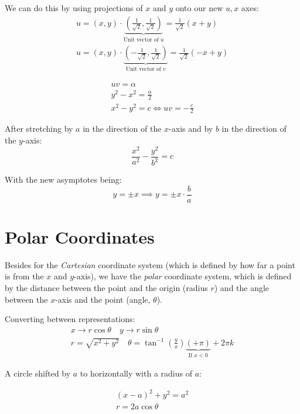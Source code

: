 \documentclass[00_complete]{subfiles}
\begin{document}
We can do this by using projections of $x$ and $y$ onto our new $u, x$ axes:
$$
\begin{gathered}
    u = (x,y) \cdot \underbrace{\left( \frac{1}{\sqrt 2}, \frac{1}{\sqrt 2}\right)}_{\text{Unit vector of $u$}} = \frac{1}{\sqrt 2}( x+y) \\
    u = (x,y) \cdot \underbrace{\left(-\frac{1}{\sqrt 2}, \frac{1}{\sqrt 2}\right)}_{\text{Unit vector of $v$}} = \frac{1}{\sqrt 2}(-x+y)
\end{gathered}
$$

\begin{conclusion}
$$
\begin{gathered}
    uv = \alpha \\
    y^2 - x^2 = \frac{\alpha}{2} \\
    x^2 - y^2 = c \iff uv = -\frac{c}{2}
\end{gathered}
$$
\end{conclusion}

After stretching by $a$ in the direction of the $x$-axis and by $b$ in the
direction of the $y$-axis:
$$\frac{x^2}{a^2} - \frac{y^2}{b^2} = c$$

With the new asymptotes being:
$$y=\pm x \implies y=\pm x \cdot \frac{b}{a}$$

\section{Polar Coordinates}

Besides for the \emph{Cartesian} coordinate system (which is defined by how far a
point is from the $x$ and $y$-axis), we have the \emph{polar} coordinate system,
which is defined by the distance between the point and the origin (radius $r$) and
the angle between the $x$-axis and the point (angle, $\theta$).

Converting between representations:
$$
\begin{gathered}
  x \to r \cos \theta \quad y \to r \sin \theta \\
  r = \sqrt{x^2+y^2} \quad \theta = \tan^{-1}\left(\frac{y}{x}\right)\underbrace{(+ \pi)}_{\text{If $x<0$}} +2 \pi k
\end{gathered}
$$

A circle shifted by $a$ to horizontally with a radius of $a$:

$$
\begin{gathered}
    (x-a)^2+y^2=a^2 \\
    r = 2a \cos \theta
\end{gathered}
$$
\end{document}
